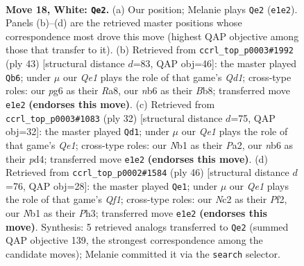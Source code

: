 \documentclass[11pt]{article}
\begin{document}
\clearpage

\begin{figure}[p]\centering
\begin{subfigure}{0.46\textwidth}\centering
\resizebox{\linewidth}{!}{%
\newchessgame
\chessboard[
  setfen={r5k1/pp3pbp/1nn2qp1/3p1b2/3P4/1B5P/PPN2PP1/RNB1Q1K1 w - - 1 18},
  showmover=false,
  pgfstyle=straightmove, color=movearrow, markmove={e1-e2}
]}
\caption{}
\end{subfigure}\hfill
\begin{subfigure}{0.46\textwidth}\centering
\resizebox{\linewidth}{!}{%
\newchessgame
\chessboard[
  setfen={rb1q1nk1/1b4p1/p3p2p/1p6/P1p1N3/4PN1P/1PQ2PP1/1B2R1K1 b - - 0 22},
  showmover=false,
  pgfstyle=straightmove, color=movearrow, markmove={d8-b6}
]}
\caption{}
\end{subfigure}
\\[4pt]
\begin{subfigure}{0.46\textwidth}\centering
\resizebox{\linewidth}{!}{%
\newchessgame
\chessboard[
  setfen={1r4k1/ppq2ppp/3b1n2/2p2b2/3p1N2/3P2PP/PPPB1PB1/R3Q1K1 w - - 1 17},
  showmover=false,
  pgfstyle=straightmove, color=movearrow, markmove={e1-d1}
]}
\caption{}
\end{subfigure}\hfill
\begin{subfigure}{0.46\textwidth}\centering
\resizebox{\linewidth}{!}{%
\newchessgame
\chessboard[
  setfen={b2r2k1/p1q1bpp1/1p2p2p/3n4/4N3/PP1BP2P/1B1R1PP1/5QK1 w - - 7 24},
  showmover=false,
  pgfstyle=straightmove, color=movearrow, markmove={f1-e1}
]}
\caption{}
\end{subfigure}
\caption{\textbf{Move 18, White: \texttt{Qe2}.} (a) Our position; Melanie plays \texttt{Qe2} (\texttt{e1e2}). Panels (b)--(d) are the retrieved master positions whose correspondence most drove this move (highest QAP objective among those that transfer to it). (b) Retrieved from \texttt{ccrl\_top\_p0003\#1992} (ply 43) [structural distance $d$=83, QAP obj=46]: the master played \texttt{Qb6}; under $\mu$ our \emph{Qe1} plays the role of that game's \emph{Qd1}; cross-type roles: our \emph{p}g6 as their \emph{R}a8, our \emph{n}b6 as their \emph{B}b8; transferred move \texttt{e1e2} \textbf{(endorses this move)}. (c) Retrieved from \texttt{ccrl\_top\_p0003\#1083} (ply 32) [structural distance $d$=75, QAP obj=32]: the master played \texttt{Qd1}; under $\mu$ our \emph{Qe1} plays the role of that game's \emph{Qe1}; cross-type roles: our \emph{N}b1 as their \emph{P}a2, our \emph{n}b6 as their \emph{p}d4; transferred move \texttt{e1e2} \textbf{(endorses this move)}. (d) Retrieved from \texttt{ccrl\_top\_p0002\#1584} (ply 46) [structural distance $d$=76, QAP obj=28]: the master played \texttt{Qe1}; under $\mu$ our \emph{Qe1} plays the role of that game's \emph{Qf1}; cross-type roles: our \emph{N}c2 as their \emph{P}f2, our \emph{N}b1 as their \emph{P}h3; transferred move \texttt{e1e2} \textbf{(endorses this move)}. Synthesis: 5 retrieved analogs transferred to \texttt{Qe2} (summed QAP objective 139, the strongest correspondence among the candidate moves); Melanie committed it via the \texttt{search} selector.}
\label{fig:thought-m34}
\end{figure}
\end{document}
